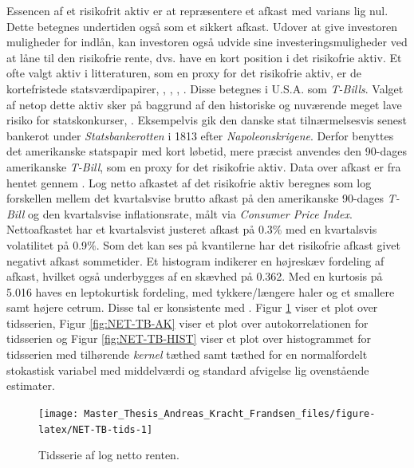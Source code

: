 \documentclass[
  a4paper,
  oneside]{memoir}
\begin{document}
Essencen af et risikofrit aktiv er at repræsentere et afkast med varians lig nul. Dette betegnes undertiden også som et sikkert afkast. Udover at give investoren muligheder for indlån, kan investoren også udvide sine investeringsmuligheder ved at låne til den risikofrie rente, dvs. have en kort position i det risikofrie aktiv. Et ofte valgt aktiv i litteraturen, som en proxy for det risikofrie aktiv, er de kortefristede statsværdipapirer, \citep{CampVic2003, CampVic1999}, \citep{JurVic2011}, \citep{Engsted2012}, \citep{CampVicCha2003}. Disse betegnes i U.S.A. som \emph{T-Bills}. Valget af netop dette aktiv sker på baggrund af den historiske og nuværende meget lave risiko for statskonkurser, \citep{Beers2017}. Eksempelvis gik den danske stat tilnærmelsesvis senest bankerot under \emph{Statsbankerotten} i 1813 efter \emph{Napoleonskrigene}. Derfor benyttes det amerikanske statspapir med kort løbetid, mere præcist anvendes den 90-dages amerikanske \emph{T-Bill}, som en proxy for det risikofrie aktiv. Data over afkast er fra \citep{CRSPt90} hentet gennem \citep{WRDSt90}. Log netto afkastet af det risikofrie aktiv beregnes som log forskellen mellem det kvartalsvise brutto afkast på den amerikanske 90-dages \emph{T-Bill} og den kvartalsvise inflationsrate, målt via \emph{Consumer Price Index}. Nettoafkastet har et kvartalsvist justeret afkast på 0.3\(\%\) med en kvartalsvis volatilitet på 0.9\(\%\). Som det kan ses på kvantilerne har det risikofrie afkast givet negativt afkast sommetider. Et histogram indikerer en højreskæv fordeling af afkast, hvilket også underbygges af en skævhed på 0.362. Med en kurtosis på 5.016 haves en leptokurtisk fordeling, med tykkere/længere haler og et smallere samt højere cetrum. Disse tal er konsistente med \citep{CampVic2003}. Figur \ref{fig:NET-TB-tids} viser et plot over tidsserien, Figur \ref{fig:NET-TB-AK} viser et plot over autokorrelationen for tidsserien og Figur \ref{fig:NET-TB-HIST} viser et plot over histogrammet for tidsserien med tilhørende \emph{kernel} tæthed samt tæthed for en normalfordelt stokastisk variabel med middelværdi og standard afvigelse lig ovenstående estimater.

\begin{figure}[H]

{\centering \texttt{[image: Master\_Thesis\_Andreas\_Kracht\_Frandsen\_files/figure-latex/NET-TB-tids-1]} 

}

\caption{Tidsserie af log netto renten.}\label{fig:NET-TB-tids}
\end{figure}
\end{document}
